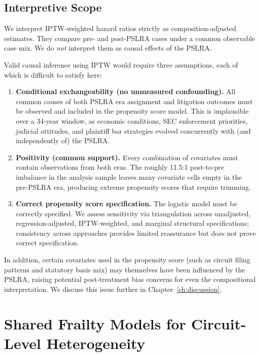 \subsection{Interpretive Scope}

We interpret IPTW-weighted hazard ratios strictly as composition-adjusted estimates. They compare pre- and post-PSLRA cases under a common observable case mix. We do \emph{not} interpret them as causal effects of the PSLRA.

Valid causal inference using IPTW would require three assumptions, each of which is difficult to satisfy here:
\begin{enumerate}
    \item \textbf{Conditional exchangeability (no unmeasured
    confounding).} All common causes of both PSLRA era assignment and litigation outcomes must be observed and included in the propensity score model. This is implausible over a
    34-year window, as economic conditions, SEC enforcement
    priorities, judicial attitudes, and plaintiff bar
    strategies evolved concurrently with (and independently
    of) the PSLRA.
    \item \textbf{Positivity (common support).} Every
    combination of covariates must contain observations from
    both eras. The roughly 11.5:1 post-to-pre imbalance in
    the analysis sample leaves many covariate cells empty in the pre-PSLRA era, producing extreme propensity scores that require trimming.
    \item \textbf{Correct propensity score specification.}
    The logistic model must be correctly specified. We assess
    sensitivity via triangulation across unadjusted,
    regression-adjusted, IPTW-weighted, and marginal
    structural specifications; consistency across approaches
    provides limited reassurance but does not prove correct
    specification.
\end{enumerate}
In addition, certain covariates used in the propensity score
(such as circuit filing patterns and statutory basis mix) may
themselves have been influenced by the PSLRA, raising
potential post-treatment bias concerns for even the
compositional interpretation. We discuss this issue further
in Chapter~\ref{ch:discussion}.

\section{Shared Frailty Models for Circuit-Level Heterogeneity}
\label{sec:frailty_method}

